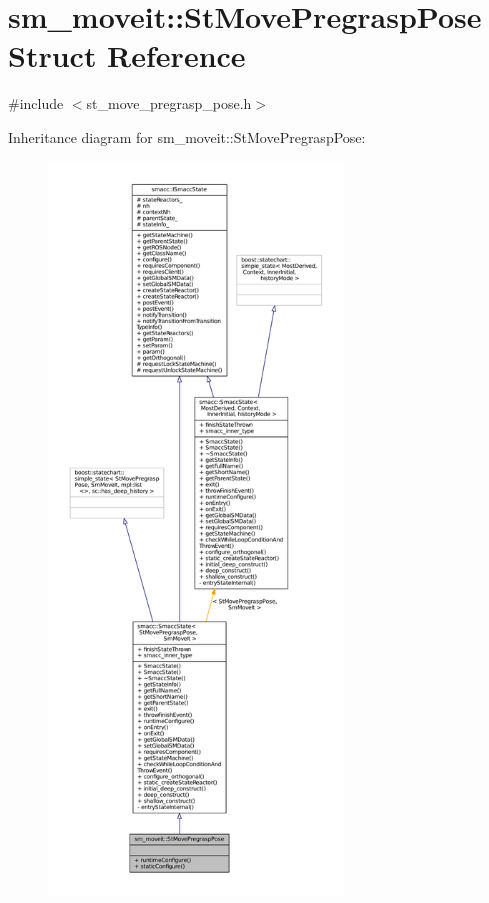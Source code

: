 \hypertarget{structsm__moveit_1_1StMovePregraspPose}{}\section{sm\+\_\+moveit\+:\+:St\+Move\+Pregrasp\+Pose Struct Reference}
\label{structsm__moveit_1_1StMovePregraspPose}


{\ttfamily \#include $<$st\+\_\+move\+\_\+pregrasp\+\_\+pose.\+h$>$}



Inheritance diagram for sm\+\_\+moveit\+:\+:St\+Move\+Pregrasp\+Pose\+:
\nopagebreak
\begin{figure}[H]
\begin{center}
\leavevmode
\includegraphics[height=550pt]{structsm__moveit_1_1StMovePregraspPose__inherit__graph}
\end{center}
\end{figure}



